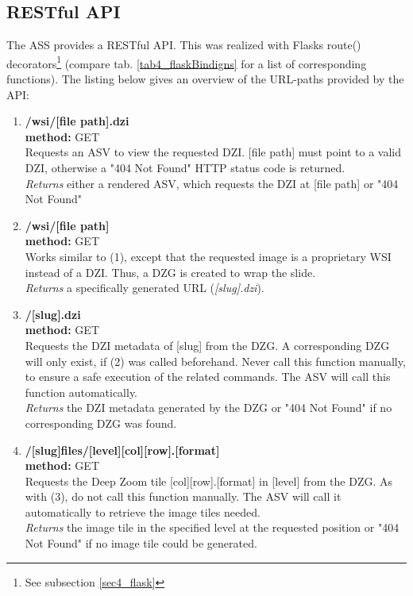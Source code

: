 \subsection{RESTful API}
\label{sec4_api}
The ASS provides a RESTful API. This was realized with Flasks route() decorators\footnote{See subsection \ref{sec4_flask}} (compare tab. \ref{tab4_flaskBindigns} for a list of corresponding functions). The listing below gives an overview of the URL-paths provided by the API:

\begin{enumerate}[(1) -]
	\item\textbf{/wsi/[file path].dzi\\
	method:} GET\\
	Requests an ASV to view the requested DZI. [file path] must point to a valid DZI, otherwise a "404 Not Found" HTTP status code is returned.\\
	\emph{Returns} either a rendered ASV, which requests the DZI at [file path] or "404 Not Found"
	
	\item \textbf{/wsi/[file path]\\
	method:} GET\\
	Works similar to (1), except that the requested image is a proprietary WSI instead of a DZI. Thus, a DZG is created to wrap the slide.\\
	\emph{Returns} a specifically generated URL (\emph{[slug].dzi}).
	
	\item \textbf{/[slug].dzi\\
	method:} GET\\
	Requests the DZI metadata of [slug] from the DZG. A corresponding DZG will only exist, if (2) was called beforehand. Never call this function manually, to ensure a safe execution of the related commands. The ASV will call this function automatically.\\
	\emph{Returns} the DZI metadata generated by the DZG or "404 Not Found" if no corresponding DZG was found.
	
	\item \textbf{/[slug]{\textunderscore}files/[level]{\textunderscore}[col]{\textunderscore}[row].[format]\\
	method:} GET\\
	Requests the Deep Zoom tile [col]{\textunderscore}[row].[format] in [level] from the DZG. As with (3), do not call this function manually. The ASV will call it automatically to retrieve the image tiles needed.\\
	\emph{Returns} the image tile in the specified level at the requested position or "404 Not Found" if no image tile could be generated.
	

\end{enumerate}
